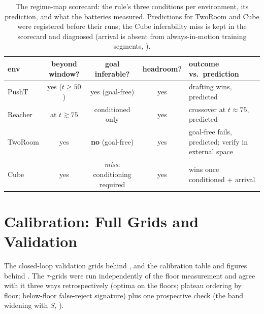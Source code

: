 \documentclass{article}
\begin{document}
\begin{table}[h]
\centering
\small
\setlength{\tabcolsep}{4pt}
\caption{The regime-map scorecard: the rule's three conditions per environment,
its prediction, and what the batteries measured. Predictions for TwoRoom and Cube
were registered before their runs; the Cube inferability miss is kept in the
scorecard and diagnosed (arrival is absent from always-in-motion training
segments, ).}
\label{tab:scorecard}
\begin{tabular}{lcccp{4.1cm}}
\toprule
env & beyond window? & goal inferable? & headroom? & outcome vs.\ prediction \\
\midrule
PushT   & yes ($t{\ge}50$) & yes (goal-free) & yes & drafting wins, predicted \\
Reacher & at $t{\gtrsim}75$ & conditioned only & yes & crossover at $t{\approx}75$, predicted \\
TwoRoom & yes & \textbf{no} (goal-free) & yes & goal-free fails, predicted; verify in external space \\
Cube    & yes & \emph{miss}: conditioning required & yes & wins once conditioned $+$ arrival \\
\bottomrule
\end{tabular}
\end{table}

\section{Calibration: Full Grids and Validation}
\label{app:calib}
The closed-loop validation grids behind , and the calibration
table and figures behind . The $\tau$-grids were run
independently of the floor measurement and agree with it three ways
retrospectively (optima on the floors; plateau ordering by floor; below-floor
false-reject signature) plus one prospective check (the band widening with
$S$, ).
\end{document}
